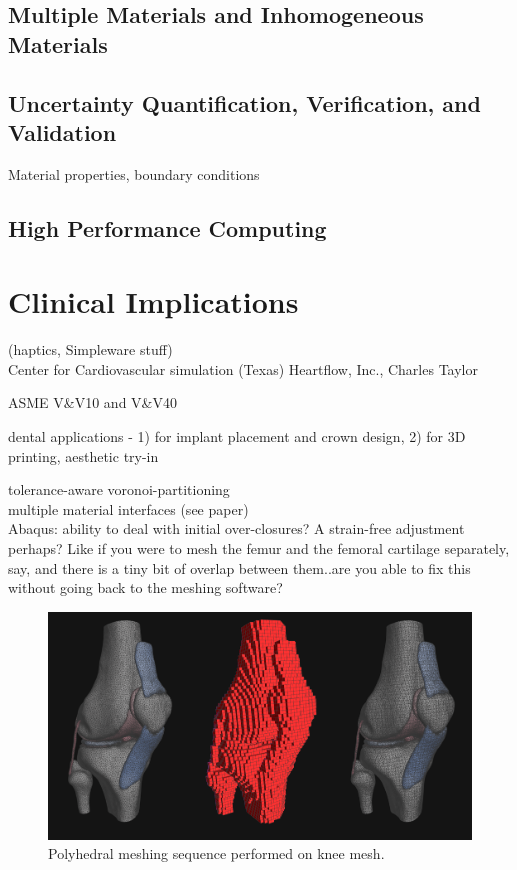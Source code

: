 \subsection{Multiple Materials and Inhomogeneous Materials}
\label{Multiple Materials and Inhomogeneous Materials}
\subsection{Uncertainty Quantification, Verification, and Validation}
\label{Uncertainty Quantification, Verification, and Validation}
Material properties, boundary conditions
\subsection{High Performance Computing}
\label{High Performance Computing}
\section{Clinical Implications}
\label{Clinical Implications}
(haptics, Simpleware stuff)\\
Center for Cardiovascular simulation (Texas)
Heartflow, Inc., Charles Taylor

ASME V\&V10 and V\&V40

dental applications - 1) for implant placement and crown design, 2) for 3D printing, aesthetic try-in 

tolerance-aware voronoi-partitioning \\
multiple material interfaces (see paper) \\

Abaqus: ability to deal with initial over-closures? A strain-free adjustment perhaps? Like if you were to mesh the femur and the femoral cartilage separately, say, and there is a tiny bit of overlap between them..are you able to fix this without going back to the meshing software?  

\begin{figure}[tbh]
\centering
\includegraphics{media/sequence.png}
\caption[sequence]{Polyhedral meshing sequence performed on knee mesh.}
\label{fig.sequence}
\end{figure}

